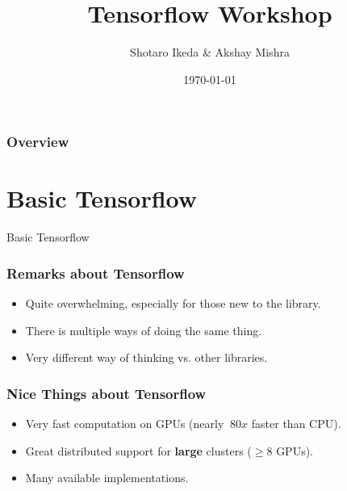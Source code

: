 \documentclass{beamer}
\title[Tensorflow Workshop]{Tensorflow Workshop} %
\author{Shotaro Ikeda \& Akshay Mishra} %
\institute[SIGAI] %
{
  \textit{http://sigai.ml} %
}
\date{\today} %
\begin{document}
\begin{frame}
  \titlepage %
\end{frame}

\begin{frame}
  \frametitle{Overview} %
  \tableofcontents %
\end{frame}


\section{Basic Tensorflow}

\begin{frame}
  \Huge{\centerline{Basic Tensorflow}}
\end{frame}

\begin{frame}
  \frametitle{Remarks about Tensorflow}
  \begin{itemize}
  \item Quite overwhelming, especially for those new to the library.
  \item There is multiple ways of doing the same thing.
  \item Very different way of thinking vs. other libraries.
  \end{itemize}
\end{frame}

\begin{frame}
  \frametitle{Nice Things about Tensorflow}
  \begin{itemize}
  \item Very fast computation on GPUs (nearly $~80x$ faster than CPU).
  \item Great distributed support for \textbf{large} clusters ($\geq 8$ GPUs).
  \item Many available implementations.
  \end{itemize}
\end{frame}
\end{document}
